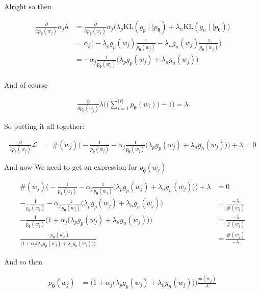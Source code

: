 \documentclass{article}
\newcommand{\KL}{\mathrm{KL}}
\newcommand{\vtheta}{\boldsymbol{\theta}}
\newcommand{\model}{p_{\vtheta}}
\begin{document}
		Alright so then 
		
		\begin{align}
			\frac{\partial}{\partial \model(w_j)} \alpha_j h &= \frac{\partial}{\partial \model(w_j)} \alpha_j\big(\lambda_p\KL(g_p\mid\mid\model) + \lambda_n\KL(g_n\mid\mid\model)\big)\\
			&= \alpha_j\bigg(-\lambda_p g_p(w_j)\frac{1}{\model(w_j)} -\lambda_n g_n(w_j)\frac{1}{\model(w_j)}\bigg)\\
			&= -\alpha_j\frac{1}{\model(w_j)}\bigg(\lambda_p g_p(w_j) +\lambda_n g_n(w_j)\bigg)\\
		\end{align}
		
		And of course
		
		\begin{align}
			\frac{\partial}{\partial \model(w_j)}  \lambda\bigg(\bigg(\sum^{|V|}_{i=1} \model(w_i)\bigg) -1 \bigg) = \lambda
		\end{align}
		
		So putting it all together:
		
		\begin{align}
			\frac{\partial}{\partial \model(w_j)} \mathcal{L} &= \#(w_j)\bigg(-\frac{1}{\model(w_j)} -\alpha_j\frac{1}{\model(w_j)}\bigg(\lambda_p g_p(w_j) +\lambda_n g_n(w_j)\bigg) \bigg) + \lambda = 0			
		\end{align}
		
		And now We need to get an expression for $\model(w_j)$
		
		\begin{align}
			\#(w_j)\bigg(-\frac{1}{\model(w_j)} -\alpha_j\frac{1}{\model(w_j)}\bigg(\lambda_p g_p(w_j) +\lambda_n g_n(w_j)\bigg) \bigg) +\lambda&= 0\\
			-\frac{1}{\model(w_j)} -\alpha_j\frac{1}{\model(w_j)}\bigg(\lambda_p g_p(w_j) +\lambda_n g_n(w_j)\bigg)  &= \frac{-\lambda}{\#(w_j)}\\
			-\frac{1}{\model(w_j)}\bigg(1 +\alpha_j\bigg(\lambda_p g_p(w_j) +\lambda_n g_n(w_j)\bigg)\bigg)  &= \frac{-\lambda}{\#(w_j)}\\
			\frac{-\model(w_j)}{\bigg(1 +\alpha_j\bigg(\lambda_p g_p(w_j) +\lambda_n g_n(w_j)\bigg)\bigg)}  &= \frac{\#(w_j)}{-\lambda}
		\end{align}
		
		And so then
		
		\begin{align}
			\model(w_j)  &= \bigg(1 +\alpha_j\bigg(\lambda_p g_p(w_j) +\lambda_n g_n(w_j)\bigg)\bigg)\frac{\#(w_j)}{\lambda}
		\end{align}
		
\end{document}
